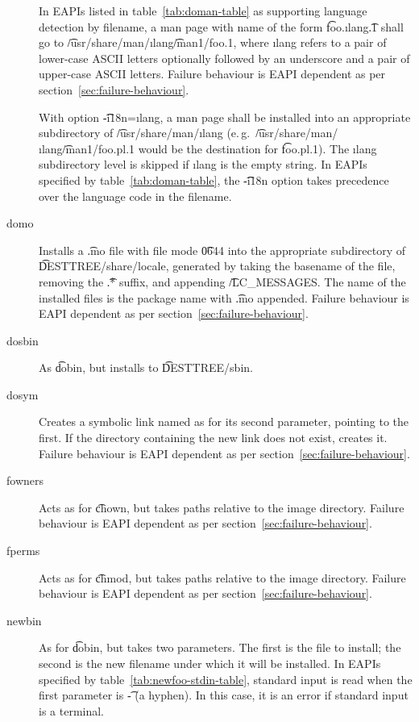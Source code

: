 \begin{description}
     In EAPIs listed in table~\ref{tab:doman-table} as supporting
    language detection by filename, a man page with name of the form \t{foo.}\i{lang}\t{.1} shall
    go to \t{/usr/share/man/}\i{lang}\t{/man1/foo.1}, where \i{lang} refers to a pair of lower-case
    ASCII letters optionally followed by an underscore and a pair of upper-case ASCII letters.
    Failure behaviour is EAPI dependent as per section~\ref{sec:failure-behaviour}.

    With option \t{-i18n=}\i{lang}, a man page shall be installed into an appropriate subdirectory
    of \t{/usr/share/man/}\i{lang} (e.\,g.\ \t{/usr/share/man/}\i{lang}\t{/man1/foo.pl.1} would be
    the destination for \t{foo.pl.1}). The \i{lang} subdirectory level is skipped if \i{lang} is
    the empty string. In EAPIs specified by table~\ref{tab:doman-table}, the \t{-i18n} option takes
    precedence over the language code in the filename.

\item[domo] Installs a \t{.mo} file with file mode \t{0644} into the appropriate subdirectory of
    \t{DESTTREE/share/locale}, generated by taking the basename of the file, removing the \t{.*}
    suffix, and appending \t{/LC\_MESSAGES}. The name of the installed files is the package name
    with \t{.mo} appended. Failure behaviour is EAPI dependent as per section~\ref{sec:failure-behaviour}.

\item[dosbin] As \t{dobin}, but installs to \t{DESTTREE/sbin}.

\item[dosym] Creates a symbolic link named as for its second parameter, pointing to the first. If
    the directory containing the new link does not exist, creates it. Failure behaviour is EAPI
    dependent as per section~\ref{sec:failure-behaviour}.

\item[fowners] Acts as for \t{chown}, but takes paths relative to the image directory. Failure
    behaviour is EAPI dependent as per section~\ref{sec:failure-behaviour}.

\item[fperms] Acts as for \t{chmod}, but takes paths relative to the image directory. Failure
    behaviour is EAPI dependent as per section~\ref{sec:failure-behaviour}.

\item[newbin]  As for \t{dobin}, but takes two parameters. The first is
    the file to install; the second is the new filename under which it will be installed. In EAPIs
    specified by table~\ref{tab:newfoo-stdin-table}, standard input is read when the first
    parameter is \t{-} (a hyphen). In this case, it is an error if standard input is a terminal.


\end{description}
